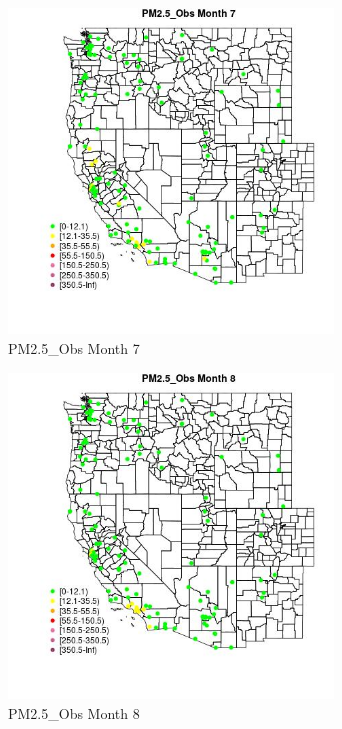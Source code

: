 \begin{figure} 
\centering  
\includegraphics[width=0.77\textwidth]{Code_Outputs/Report_ML_input_PM25_Step4_part_e_de_duplicated_aves_MapObsMo7PM25_Obs.jpg} 
\caption{\label{fig:Report_ML_input_PM25_Step4_part_e_de_duplicated_avesMapObsMo7PM25_Obs}PM2.5_Obs Month 7} 
\end{figure} 
 

\begin{figure} 
\centering  
\includegraphics[width=0.77\textwidth]{Code_Outputs/Report_ML_input_PM25_Step4_part_e_de_duplicated_aves_MapObsMo8PM25_Obs.jpg} 
\caption{\label{fig:Report_ML_input_PM25_Step4_part_e_de_duplicated_avesMapObsMo8PM25_Obs}PM2.5_Obs Month 8} 
\end{figure} 
 

